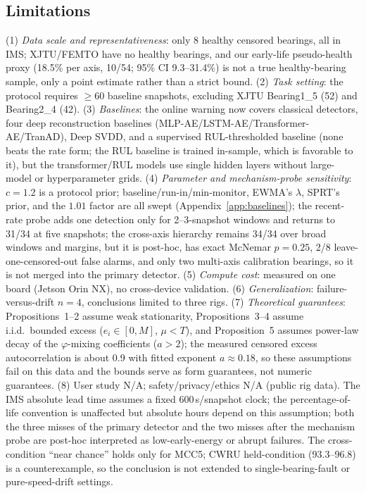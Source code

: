 \documentclass[journal]{IEEEtran}
\begin{document}
\subsection{Limitations}\label{sec:limitations}
(1) \emph{Data scale and representativeness}: only 8 healthy censored bearings, all in IMS; XJTU/FEMTO have no healthy bearings, and our early-life pseudo-health proxy (18.5\% per axis, 10/54; 95\% CI 9.3--31.4\%) is not a true healthy-bearing sample, only a point estimate rather than a strict bound. (2) \emph{Task setting}: the protocol requires $\ge60$ baseline snapshots, excluding XJTU Bearing1\_5 (52) and Bearing2\_4 (42). (3) \emph{Baselines}: the online warning now covers classical detectors, four deep reconstruction baselines (MLP-AE/LSTM-AE/Transformer-AE/TranAD), Deep SVDD, and a supervised RUL-thresholded baseline (none beats the rate form; the RUL baseline is trained in-sample, which is favorable to it), but the transformer/RUL models use single hidden layers without large-model or hyperparameter grids. (4) \emph{Parameter and mechanism-probe sensitivity}: $c=1.2$ is a protocol prior; baseline/run-in/min-monitor, EWMA's $\lambda$, SPRT's prior, and the $1.01$ factor are all swept (Appendix~\ref{app:baselines}); the recent-rate probe adds one detection only for 2--3-snapshot windows and returns to 31/34 at five snapshots; the cross-axis hierarchy remains 34/34 over broad windows and margins, but it is post-hoc, has exact McNemar $p=0.25$, 2/8 leave-one-censored-out false alarms, and only two multi-axis calibration bearings, so it is not merged into the primary detector. (5) \emph{Compute cost}: measured on one board (Jetson Orin NX), no cross-device validation. (6) \emph{Generalization}: failure-versus-drift $n=4$, conclusions limited to three rigs. (7) \emph{Theoretical guarantees}: Propositions~1--2 assume weak stationarity, Propositions~3--4 assume i.i.d.\ bounded excess ($e_i\in[0,M]$, $\mu<T$), and Proposition~5 assumes power-law decay of the $\varphi$-mixing coefficients ($a>2$); the measured censored excess autocorrelation is about 0.9 with fitted exponent $a\approx0.18$, so these assumptions fail on this data and the bounds serve as form guarantees, not numeric guarantees. (8) User study N/A; safety/privacy/ethics N/A (public rig data). The IMS absolute lead time assumes a fixed 600\,s/snapshot clock; the percentage-of-life convention is unaffected but absolute hours depend on this assumption; both the three misses of the primary detector and the two misses after the mechanism probe are post-hoc interpreted as low-early-energy or abrupt failures. The cross-condition ``near chance'' holds only for MCC5; CWRU held-condition (93.3--96.8) is a counterexample, so the conclusion is not extended to single-bearing-fault or pure-speed-drift settings.
\end{document}

